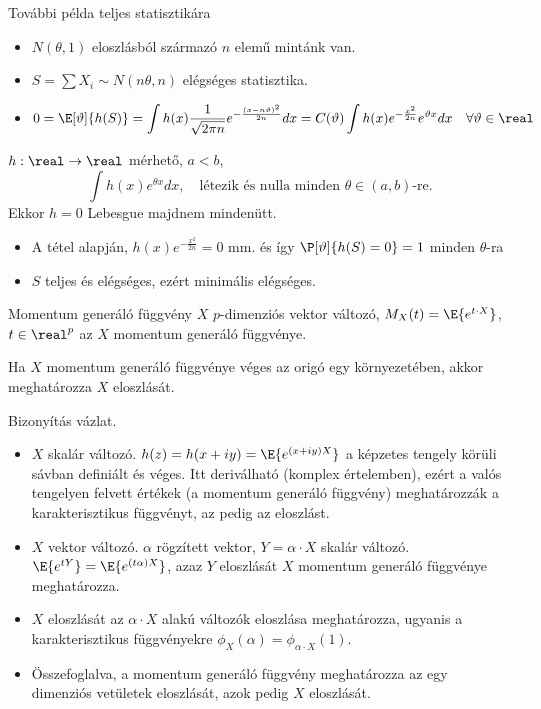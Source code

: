 \documentclass[aspectratio=169,notheorems,9pt,\option]{beamer}
\begin{document}
\begin{frame}{További példa teljes statisztikára}
  \begin{itemize}
    \item $N(\theta,1)$ eloszlásból származó $n$ elemű mintánk van.
    \item $S=\sum X_i\sim N(n\theta,n)$ elégséges statisztika.
    \item 
    \begin{displaymath}
      0=\E[\theta]{h(S)}=\int h(x)\frac{1}{\sqrt{2\pi n}} e^{-\frac{(x-n\theta)^2}{2n}}d x 
      =C(\theta)\int h(x)e^{-\frac{x^2}{2n}}e^{\theta x}d x\quad\forall\theta\in\real  
    \end{displaymath} 
  \end{itemize}
  \begin{theorem}
    $h:\real\to\real$ mérhető, $a<b$, 
    \begin{displaymath}
      \int h(x)e^{\theta x} d x,\quad\text{létezik és nulla minden $\theta\in(a,b)$-re}.
    \end{displaymath} 
    Ekkor $h=0$ Lebesgue majdnem mindenütt.
  \end{theorem}
  \begin{itemize}
    \item A tétel alapján, $h(x)e^{-\frac{x^2}{2n}}=0$ mm. és így $\P[\theta]{h(S)=0}=1$ minden $\theta$-ra
    \item $S$ teljes és elégséges, ezért minimális elégséges.
  \end{itemize}
\end{frame}

\begin{frame}{Momentum generáló függvény}  
  $X$ $p$-dimenziós vektor változó, $M_X(t)=\E{e^{t\cdot X}}$, $t\in\real^p$ az $X$ momentum generáló függvénye. 
  \begin{proposition}
    Ha $X$ momentum generáló függvénye véges az origó egy
    környezetében, akkor meghatározza $X$ eloszlását.
  \end{proposition}
  \continue
  Bizonyítás vázlat.
  \begin{itemize}   
  \item $X$ skalár változó. $h (z)=h (x+iy)=\E{e^{(x+iy) X}}$  a képzetes tengely körüli
    sávban definiált és véges. Itt deriválható (komplex értelemben),
    ezért a valós tengelyen felvett értékek (a momentum generáló függvény)
    meghatározzák a karakterisztikus függvényt, az pedig az eloszlást.
 
  \item $X$ vektor változó. $\alpha$ rögzített vektor, $Y=\alpha\cdot
    X$ skalár változó. $\E{e^{tY}}=\E{e^{(t\alpha)X}}$, azaz $Y$ eloszlását
    $X$ momentum generáló függvénye meghatározza.
  \item $X$ eloszlását az $\alpha\cdot X$ alakú változók eloszlása
    meghatározza, ugyanis a karakterisztikus függvényekre
    $\phi_{X} (\alpha)=\phi_{\alpha\cdot X} (1)$.
  \item Összefoglalva, a momentum generáló függvény meghatározza az
    egy dimenziós vetületek eloszlását, azok pedig $X$ eloszlását.
  \end{itemize}
  
\end{frame}
\end{document}
